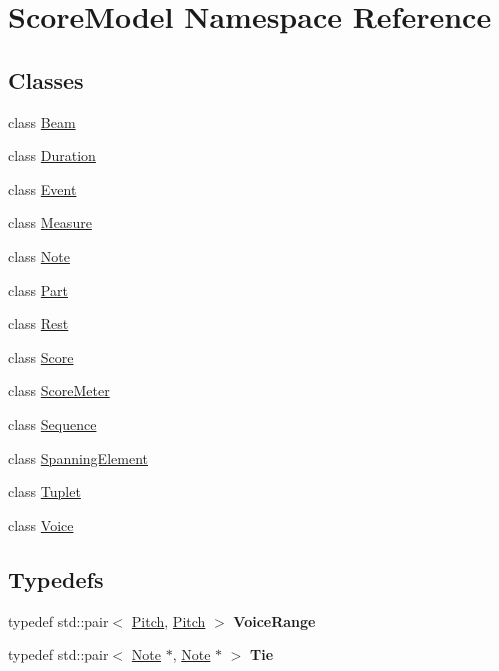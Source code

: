 \hypertarget{namespaceScoreModel}{}\section{Score\+Model Namespace Reference}
\label{namespaceScoreModel}
\subsection*{Classes}
\begin{DoxyCompactItemize}
\item 
class \mbox{\hyperlink{classScoreModel_1_1Beam}{Beam}}
\item 
class \mbox{\hyperlink{classScoreModel_1_1Duration}{Duration}}
\item 
class \mbox{\hyperlink{classScoreModel_1_1Event}{Event}}
\item 
class \mbox{\hyperlink{classScoreModel_1_1Measure}{Measure}}
\item 
class \mbox{\hyperlink{classScoreModel_1_1Note}{Note}}
\item 
class \mbox{\hyperlink{classScoreModel_1_1Part}{Part}}
\item 
class \mbox{\hyperlink{classScoreModel_1_1Rest}{Rest}}
\item 
class \mbox{\hyperlink{classScoreModel_1_1Score}{Score}}
\item 
class \mbox{\hyperlink{classScoreModel_1_1ScoreMeter}{Score\+Meter}}
\item 
class \mbox{\hyperlink{classScoreModel_1_1Sequence}{Sequence}}
\item 
class \mbox{\hyperlink{classScoreModel_1_1SpanningElement}{Spanning\+Element}}
\item 
class \mbox{\hyperlink{classScoreModel_1_1Tuplet}{Tuplet}}
\item 
class \mbox{\hyperlink{classScoreModel_1_1Voice}{Voice}}
\end{DoxyCompactItemize}
\subsection*{Typedefs}
\begin{DoxyCompactItemize}
\item 
\mbox{\label{namespaceScoreModel_aef5e9313fc764e514481998742a22129}} 
typedef std\+::pair$<$ \mbox{\hyperlink{classPitch}{Pitch}}, \mbox{\hyperlink{classPitch}{Pitch}} $>$ {\bfseries Voice\+Range}
\item 
\mbox{\label{namespaceScoreModel_a6dfeff7ae2e3434c563b5ba3cc4306ee}} 
typedef std\+::pair$<$ \mbox{\hyperlink{classScoreModel_1_1Note}{Note}} $\ast$, \mbox{\hyperlink{classScoreModel_1_1Note}{Note}} $\ast$ $>$ {\bfseries Tie}
\end{DoxyCompactItemize}


